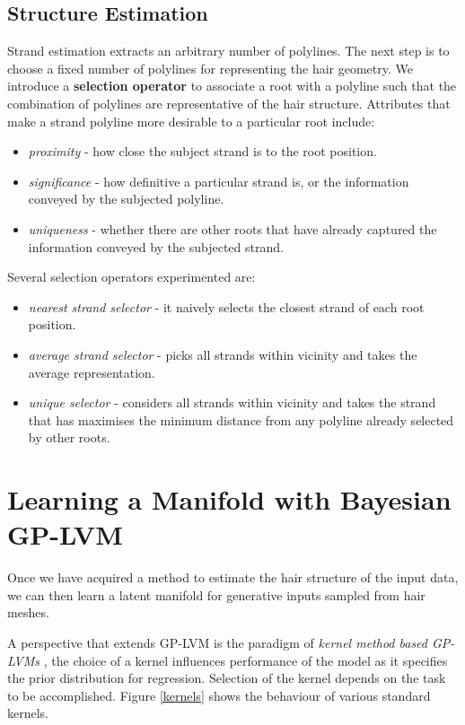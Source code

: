 \documentclass[ %
author={Dillon Keith Diep},
supervisor={Dr. Carl Henrik Ek},
degree={MEng},
title={ART-CG Hair:},
subtitle={Assisted Real-time Content Generation of Stylised Virtual Hair},
type={Research},
year={2017} ]{dissertation}
\begin{document}
\subsection{Structure Estimation}
Strand estimation extracts an arbitrary number of polylines. The next step is to choose a fixed number of polylines for representing the hair geometry. We introduce a \textbf{selection operator} to associate a root with a polyline such that the combination of polylines are representative of the hair structure. Attributes that make a strand polyline more desirable to a particular root include:
\begin{itemize}
	\item \textit{proximity} - how close the subject strand is to the root position.
	\item \textit{significance} - how definitive a particular strand is, or the information conveyed by the subjected polyline.
	\item \textit{uniqueness} - whether there are other roots that have already captured the information conveyed by the subjected strand.
\end{itemize}
Several selection operators experimented are:
\begin{itemize}
	\item \textit{nearest strand selector} - it naively selects the closest strand of each root position. 
	\item \textit{average strand selector} - picks all strands within vicinity and takes the average representation.
	\item \textit{unique selector} - considers all strands within vicinity and takes the strand that has maximises the minimum distance from any polyline already selected by other roots.
\end{itemize}

\section{Learning a Manifold with Bayesian GP-LVM}
Once we have acquired a method to estimate the hair structure of the input data, we can then learn a latent manifold for generative inputs sampled from hair meshes. 

A perspective that extends GP-LVM is the paradigm of \textit{kernel method based GP-LVMs} \cite{reviewgplvm}, the choice of a kernel influences performance of the model as it specifies the prior distribution for regression. Selection of the kernel depends on the task to be accomplished. Figure \ref{kernels} shows the behaviour of various standard kernels.
\end{document}
